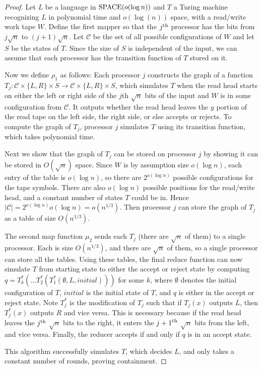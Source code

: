\documentclass{llncs}
\begin{document}
\begin{proof}
Let $L$ be a language in $\textup{SPACE}(o(\log n))$ and $T$ a Turing machine
recognizing $L$ in polynomial time and $o(\log(n))$ space, with a read/write
work tape $W$. Define the first mapper so that the $j^\textup{th}$ processor
has the bits from $j\sqrt{n}$ to $(j+1)\sqrt{n}$. Let $\mathcal{C}$ be the set
of all possible configurations of $W$ and let $S$ be the states of $T$. Since
the size of $S$ is independent of the input, we can assume that each processor
has the transition function of $T$ stored on it.

Now we define $\rho_1$ as follows: Each processor $j$ constructs the graph of a
function $T_j:\mathcal{C} \times \{L,R\} \times S \rightarrow \mathcal{C}
\times \{L,R\} \times S$, which simulates $T$ when the read head starts on
either the left or right side of the $j$th $\sqrt{n}$ bits of the input and $W$
is in some configuration from $\mathcal{C}$. It outputs whether the read head
leaves the $y$ portion of the read tape on the left side, the right side, or
else accepts or rejects. To compute the graph of $T_j$, processor $j$
simulates $T$ using its transition function, which takes polynomial time.

Next we show that the graph of $T_j$ can be stored on processor $j$ by showing
it can be stored in $O(\sqrt{n})$ space. Since $W$ is by assumption size
$o(\log n)$, each entry of the table is $o(\log n)$, so there are $2^{o(\log
n)}$ possible configurations for the tape symbols. There are also $o(\log n)$
possible positions for the read/write head, and a constant number of states $T$
could be in. Hence $|\mathcal{C}| = 2^{o(\log n)} o(\log n) = o(n^{1/3})$.
Then processor $j$ can store the graph of $T_j$ as a table of size
$O(n^{1/3})$.

The second map function $\mu_2$ sends each $T_j$ (there are $\sqrt{n}$ of them)
to a single processor. Each is size $O(n^{1/3})$, and there are $\sqrt{n}$ of
them, so a single processor can store all the tables. Using these tables, the
final reduce function can now simulate $T$ from starting state to either the
accept or reject state by computing $q=T_k^*(\ldots
T_2^*(T_1^*(\emptyset,L,initial)))$ for some $k$, where $\emptyset$ denotes the
initial configuration of $T$, $initial$ is the initial state of $T$, and $q$ is
either in the accept or reject state. Note $T_j^*$ is the modification of $T_j$
such that if $T_j(x)$ outputs $L$, then $T_j^*(x)$ outputs $R$ and vice versa.
This is necessary because if the read head leaves the $j^\textup{th}$
$\sqrt{n}$ bits to the right, it enters the ${j+1}^\textup{th}$ $\sqrt{n}$ bits
from the left, and vice versa. Finally, the reducer accepts if and only if $q$ is in an
accept state.

This algorithm successfully simulates $T$, which decides $L$, and only takes a
constant number of rounds, proving containment. \end{proof}
\end{document}
